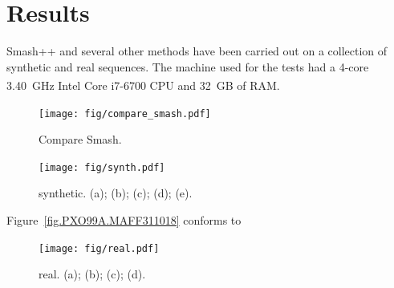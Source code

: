 \documentclass[a4paper,num-refs]{oup-contemporary}
\begin{document}
\section{Results} \label{sec.results}
Smash++ and several other methods have been carried out on a collection of synthetic and real sequences. The machine used for the tests had a 4-core 3.40~GHz Intel\textsuperscript{\textregistered} Core{\texttrademark} i7-6700 CPU and 32~GB of RAM.


\begin{figure}[!h]
  \centering
  \texttt{[image: fig/compare\_smash.pdf]}
  \caption{Compare Smash.}
  \label{fig.compare.smash}
\end{figure}

\begin{figure}[!h]
  \centering
  \texttt{[image: fig/synth.pdf]}
  \caption{synthetic. (a); (b); (c); (d); (e).}
  \label{fig.synth}
\end{figure}

Figure~\ref{fig.PXO99A.MAFF311018} conforms to \cite{salzberg2008genome}
\begin{figure}[!h]
  \centering
  \texttt{[image: fig/real.pdf]}
  \caption{real. (a); (b); (c); (d).}
  \label{fig.real}
\end{figure}


\end{document}
